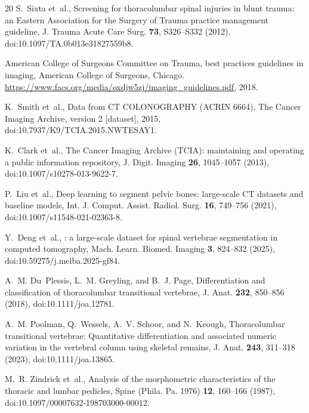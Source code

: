 \documentclass[aapm,mph,amsmath,amssymb,reprint]{revtex4-2}
\begin{document}
\begin{thebibliography}{20}
S.~Sixta et~al.,
\newblock Screening for thoracolumbar spinal injuries in blunt trauma: an {Eastern Association for the Surgery of Trauma} practice management guideline,
\newblock J. Trauma Acute Care Surg. {\bf 73}, S326--S332 (2012),
\newblock doi:10.1097/TA.0b013e31827559b8.

{American College of Surgeons Committee on Trauma},
 best practices guidelines in imaging,
\newblock American College of Surgeons, Chicago. \url{https://www.facs.org/media/oxdjw5zj/imaging_guidelines.pdf}, 2018.

K.~Smith et~al.,
\newblock Data from {CT COLONOGRAPHY} ({ACRIN} 6664),
\newblock The Cancer Imaging Archive, version 2 [dataset], 2015,
\newblock doi:10.7937/K9/TCIA.2015.NWTESAY1.

K.~Clark et~al.,
\newblock The {Cancer Imaging Archive} ({TCIA}): maintaining and operating a public information repository,
\newblock J. Digit. Imaging {\bf 26}, 1045--1057 (2013),
\newblock doi:10.1007/s10278-013-9622-7.

P.~Liu et~al.,
\newblock Deep learning to segment pelvic bones: large-scale {CT} datasets and baseline models,
\newblock Int. J. Comput. Assist. Radiol. Surg. {\bf 16}, 749--756 (2021),
\newblock doi:10.1007/s11548-021-02363-8.

Y.~Deng et~al.,
: a large-scale dataset for spinal vertebrae segmentation in computed tomography,
\newblock Mach. Learn. Biomed. Imaging {\bf 3}, 824--832 (2025),
\newblock doi:10.59275/j.melba.2025-gf84.

A.~M. Du~Plessis, L.~M. Greyling, and B.~J. Page,
\newblock Differentiation and classification of thoracolumbar transitional vertebrae,
\newblock J. Anat. {\bf 232}, 850--856 (2018),
\newblock doi:10.1111/joa.12781.

A.~M. Poolman, Q.~Wessels, A.~V. Schoor, and N.~Keough,
\newblock Thoracolumbar transitional vertebrae: Quantitative differentiation and associated numeric variation in the vertebral column using skeletal remains,
\newblock J. Anat. {\bf 243}, 311--318 (2023),
\newblock doi:10.1111/joa.13865.

M.~R. Zindrick et~al.,
\newblock Analysis of the morphometric characteristics of the thoracic and lumbar pedicles,
\newblock Spine (Phila. Pa. 1976) {\bf 12}, 160--166 (1987),
\newblock doi:10.1097/00007632-198703000-00012.


\end{thebibliography}
\end{document}
